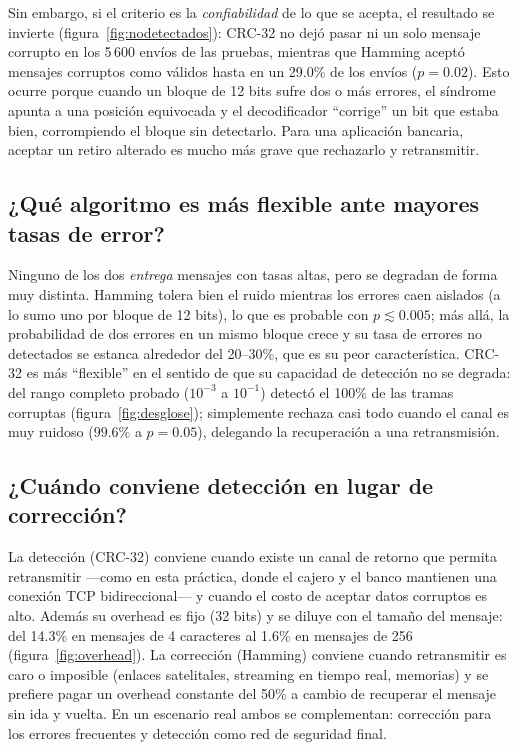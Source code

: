 \documentclass[11pt,letterpaper]{article}
\begin{document}
Sin embargo, si el criterio es la \emph{confiabilidad} de lo que se acepta, el
resultado se invierte (figura~\ref{fig:nodetectados}): CRC-32 no dejó pasar ni
un solo mensaje corrupto en los 5\,600 envíos de las pruebas, mientras que
Hamming aceptó mensajes corruptos como válidos hasta en un 29.0\% de los envíos
($p=0.02$). Esto ocurre porque cuando un bloque de 12 bits sufre dos o más
errores, el síndrome apunta a una posición equivocada y el decodificador
``corrige'' un bit que estaba bien, corrompiendo el bloque sin detectarlo.
Para una aplicación bancaria, aceptar un retiro alterado es mucho más grave
que rechazarlo y retransmitir.

\subsection*{¿Qué algoritmo es más flexible ante mayores tasas de error?}

Ninguno de los dos \emph{entrega} mensajes con tasas altas, pero se degradan de
forma muy distinta. Hamming tolera bien el ruido mientras los errores caen
aislados (a lo sumo uno por bloque de 12 bits), lo que es probable con
$p \lesssim 0.005$; más allá, la probabilidad de dos errores en un mismo bloque
crece y su tasa de errores no detectados se estanca alrededor del 20--30\%,
que es su peor característica. CRC-32 es más ``flexible'' en el sentido de que
su capacidad de detección no se degrada: del rango completo probado
($10^{-3}$ a $10^{-1}$) detectó el 100\% de las tramas corruptas
(figura~\ref{fig:desglose}); simplemente rechaza casi todo cuando el canal es
muy ruidoso ($99.6\%$ a $p=0.05$), delegando la recuperación a una
retransmisión.

\subsection*{¿Cuándo conviene detección en lugar de corrección?}

La detección (CRC-32) conviene cuando existe un canal de retorno que permita
retransmitir —como en esta práctica, donde el cajero y el banco mantienen una
conexión TCP bidireccional— y cuando el costo de aceptar datos corruptos es
alto. Además su overhead es fijo (32 bits) y se diluye con el tamaño del
mensaje: del 14.3\% en mensajes de 4 caracteres al 1.6\% en mensajes de 256
(figura~\ref{fig:overhead}). La corrección (Hamming) conviene cuando
retransmitir es caro o imposible (enlaces satelitales, streaming en tiempo
real, memorias) y se prefiere pagar un overhead constante del 50\% a cambio de
recuperar el mensaje sin ida y vuelta. En un escenario real ambos se
complementan: corrección para los errores frecuentes y detección como red de
seguridad final.
\end{document}
